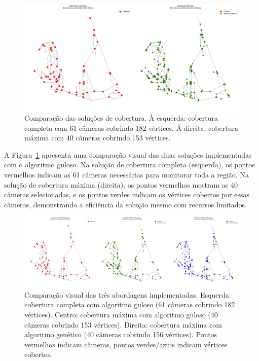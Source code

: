 \documentclass[12pt, a4paper]{report}
\begin{document}
\begin{figure}[H]
    \centering
    \includegraphics[width=\textwidth]{resultados/visualizacao_cobertura}
    \caption{Comparação das soluções de cobertura. À esquerda: cobertura completa com 61 câmeras cobrindo 182 vértices. À direita: cobertura máxima com 40 câmeras cobrindo 153 vértices.}
    \label{fig:visualizacao_cobertura}
\end{figure}

A Figura~\ref{fig:visualizacao_cobertura} apresenta uma comparação visual das duas soluções implementadas com o algoritmo guloso. Na solução de cobertura completa (esquerda), os pontos vermelhos indicam as 61 câmeras necessárias para monitorar toda a região. Na solução de cobertura máxima (direita), os pontos vermelhos mostram as 40 câmeras selecionadas, e os pontos verdes indicam os vértices cobertos por essas câmeras, demonstrando a eficiência da solução mesmo com recursos limitados.

\begin{figure}[H]
    \centering
    \includegraphics[width=\textwidth]{visualizacao_comparacao}
    \caption{Comparação visual das três abordagens implementadas. Esquerda: cobertura completa com algoritmo guloso (61 câmeras cobrindo 182 vértices). Centro: cobertura máxima com algoritmo guloso (40 câmeras cobrindo 153 vértices). Direita: cobertura máxima com algoritmo genético (40 câmeras cobrindo 156 vértices). Pontos vermelhos indicam câmeras, pontos verdes/azuis indicam vértices cobertos.}
    \label{fig:visualizacao_comparacao}
\end{figure}
\end{document}

